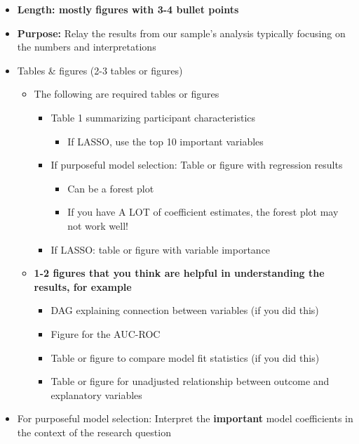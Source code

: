 \documentclass[
  letterpaper,
  DIV=11,
  numbers=noendperiod]{scrartcl}
\providecommand{\tightlist}{%
  \setlength{\itemsep}{0pt}\setlength{\parskip}{0pt}}
\begin{document}
\begin{itemize}
\tightlist
\item
  \textbf{Length: mostly figures with 3-4 bullet points}
\item
  \textbf{Purpose:} Relay the results from our sample's analysis
  typically focusing on the numbers and interpretations
\item
  Tables \& figures (2-3 tables or figures)

  \begin{itemize}
  \tightlist
  \item
    The following are required tables or figures

    \begin{itemize}
    \tightlist
    \item
      Table 1 summarizing participant characteristics

      \begin{itemize}
      \tightlist
      \item
        If LASSO, use the top 10 important variables
      \end{itemize}
    \item
      If {purposeful model selection}: Table or figure with regression
      results

      \begin{itemize}
      \tightlist
      \item
        Can be a forest plot
      \item
        If you have A LOT of coefficient estimates, the forest plot may
        not work well!
      \end{itemize}
    \item
      If {LASSO}: table or figure with variable importance
    \end{itemize}
  \item
    \textbf{1-2 figures that you think are helpful in understanding the
    results, for example}

    \begin{itemize}
    \item
      DAG explaining connection between variables (if you did this)
    \item
      Figure for the AUC-ROC
    \item
      Table or figure to compare model fit statistics (if you did this)
    \item
      Table or figure for unadjusted relationship between outcome and
      explanatory variables
    \end{itemize}
  \end{itemize}
\item
  {For purposeful model selection:} Interpret the \textbf{important}
  model coefficients in the context of the research question


\end{itemize}
\end{document}
